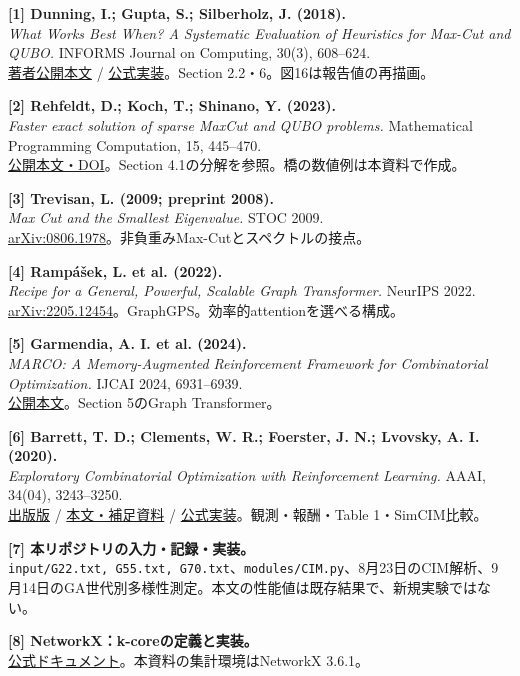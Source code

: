 \newpage
{}
{\small
\noindent\textbf{[1] Dunning, I.; Gupta, S.; Silberholz, J. (2018).}\\
\textit{What Works Best When? A Systematic Evaluation of Heuristics for Max-Cut and QUBO.} INFORMS Journal on Computing, 30(3), 608--624.\\
\href{https://raw.githubusercontent.com/MQLib/MQLib/master/paper/SECM_final.pdf}{著者公開本文} / \href{https://github.com/MQLib/MQLib}{公式実装}。Section 2.2・6。図16は報告値の再描画。

\noindent\textbf{[2] Rehfeldt, D.; Koch, T.; Shinano, Y. (2023).}\\
\textit{Faster exact solution of sparse MaxCut and QUBO problems.} Mathematical Programming Computation, 15, 445--470.\\
\href{https://doi.org/10.1007/s12532-023-00236-6}{公開本文・DOI}。Section 4.1の分解を参照。橋の数値例は本資料で作成。

\noindent\textbf{[3] Trevisan, L. (2009; preprint 2008).}\\
\textit{Max Cut and the Smallest Eigenvalue.} STOC 2009.\\
\href{https://arxiv.org/abs/0806.1978}{arXiv:0806.1978}。非負重みMax-Cutとスペクトルの接点。

\noindent\textbf{[4] Rampášek, L. et al. (2022).}\\
\textit{Recipe for a General, Powerful, Scalable Graph Transformer.} NeurIPS 2022.\\
\href{https://arxiv.org/abs/2205.12454}{arXiv:2205.12454}。GraphGPS。効率的attentionを選べる構成。

\noindent\textbf{[5] Garmendia, A. I. et al. (2024).}\\
\textit{MARCO: A Memory-Augmented Reinforcement Framework for Combinatorial Optimization.} IJCAI 2024, 6931--6939.\\
\href{https://www.ijcai.org/proceedings/2024/0766.pdf}{公開本文}。Section 5のGraph Transformer。

\noindent\textbf{[6] Barrett, T. D.; Clements, W. R.; Foerster, J. N.; Lvovsky, A. I. (2020).}\\
\textit{Exploratory Combinatorial Optimization with Reinforcement Learning.} AAAI, 34(04), 3243--3250.\\
\href{https://ojs.aaai.org/index.php/AAAI/article/view/5723}{出版版} / \href{https://arxiv.org/abs/1909.04063}{本文・補足資料} / \href{https://github.com/tomdbar/eco-dqn}{公式実装}。観測・報酬・Table 1・SimCIM比較。

\noindent\textbf{[7] 本リポジトリの入力・記録・実装。}\\
\texttt{input/G22.txt, G55.txt, G70.txt}、\texttt{modules/CIM.py}、8月23日のCIM解析、9月14日のGA世代別多様性測定。本文の性能値は既存結果で、新規実験ではない。

\noindent\textbf{[8] NetworkX：k-coreの定義と実装。}\\
\href{https://networkx.org/documentation/stable/reference/algorithms/generated/networkx.algorithms.core.k_core.html}{公式ドキュメント}。本資料の集計環境はNetworkX 3.6.1。
}
